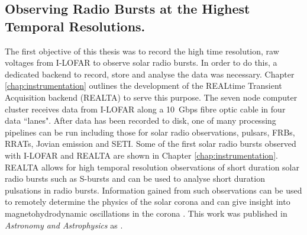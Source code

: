 \subsection{Observing Radio Bursts at the Highest Temporal Resolutions.}
The first objective of this thesis was to record the high time resolution, raw voltages from I-LOFAR to observe solar radio bursts.
In order to do this, a dedicated backend to record, store and analyse the data was necessary. Chapter \ref{chap:instrumentation} outlines the development of the REALtime Transient Acquisition backend (REALTA) to serve this purpose. The seven node computer cluster receives data from I-LOFAR along a 10~Gbps fibre optic cable in four data ``lanes". After data has been recorded to disk, one of many processing pipelines can be run including those for solar radio observations, pulsars, FRBs, RRATs, Jovian emission and SETI. Some of the first solar radio bursts observed with I-LOFAR and REALTA are shown in Chapter \ref{chap:instrumentation}. REALTA allows for high temporal resolution observations of short duration solar radio bursts such as S-bursts and can be used to analyse short duration pulsations in radio bursts. Information gained from such observations can be used to remotely determine the physics of the solar corona \citep{Morosan2015, Clarke2019} and can give insight into magnetohydrodynamic oscillations in the corona \citep{Carley2019}.  This work was published in \textit{Astronomy and Astrophysics} as \cite{Murphy2021b}.


